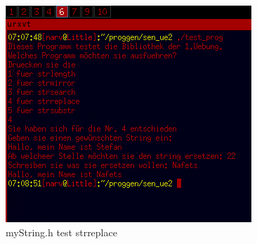 \documentclass{scrartcl}
\begin{document}
\begin{figure}[H]
  \centering
  \includegraphics[width=0.9\linewidth]{images/test_prog4.png}
  \caption{myString.h test strreplace}
  \label{fig:digraph}
\end{figure}
\end{document}
